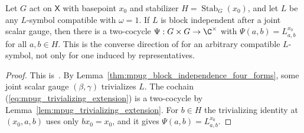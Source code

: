 \begin{lemma}
    \label{lem:mpug_bi_basepoint_extension}
    \leanok
    Let $G$ act on $\mathsf X$ with basepoint $x_0$ and stabilizer
    $H=\operatorname{Stab}_G(x_0)$, and let $L$ be any $L$-symbol compatible
    with $\omega=1$. If $L$ is block independent after a joint scalar gauge,
    then there is a two-cocycle $\Psi:G\times G\to\C^\times$ with
    $\Psi(a,b)=L^{x_0}_{a,b}$ for all $a,b\in H$. This is the converse
    direction of \cite[lines~7057--7064]{FrancoRubio2025MPUGauging} for an
    arbitrary compatible $L$-symbol, not only for one induced by
    representatives.
\end{lemma}

\begin{proof}\leanok
    This is~\cite[``Block independence extends the stabilizer
        cocycle'']{QICLean2026Blueprint}.
    By Lemma~\ref{thm:mpug_block_independence_four_forms}, some joint scalar
    gauge $(\beta,\gamma)$ trivializes $L$. The cochain
    (\ref{eq:mpug_trivializing_extension}) is a two-cocycle by
    Lemma~\ref{lem:mpug_trivializing_extension}. For $b\in H$ the trivializing
    identity at $(x_0,a,b)$ uses only $bx_0=x_0$, and it gives
    $\Psi(a,b)=L^{x_0}_{a,b}$.
\end{proof}

